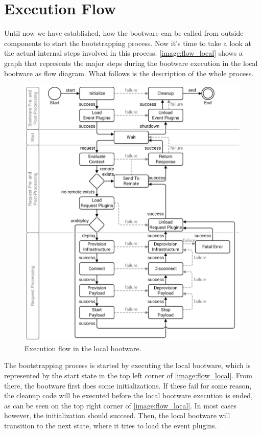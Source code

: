 \section{Execution Flow}
\label{flow}

Until now we have established, how the bootware can be called from outside components to start the bootstrapping process.
Now it's time to take a look at the actual internal steps involved in this process.
\autoref{image:flow_local} shows a graph that represents the major steps during the bootware execution in the local bootware as flow diagram.
What follows is the description of the whole process.

\begin{figure}[!htbp]
	\centering
	\includegraphics[resolution=600]{design/assets/flow_local}
	\caption{Execution flow in the local bootware.}
	\label{image:flow_local}
\end{figure}

The bootstrapping process is started by executing the local bootware, which is represented by the start state in the top left corner of \autoref{image:flow_local}.
From there, the bootware first does some initializations.
If these fail for some reason, the cleanup code will be executed before the local bootware execution is ended, as can be seen on the top right corner of \autoref{image:flow_local}.
In most cases however, the initialization should succeed.
Then, the local bootware will transition to the next state, where it tries to load the event plugins.

